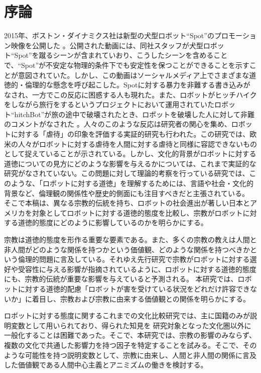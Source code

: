 \documentclass[a4j,12pt]{jreport}
\begin{document}
\chapter{序論}
2015年、ボストン・ダイナミクス社は新型の犬型ロボット``Spot''のプロモーション映像を公開した\cite{spot} 。公開された動画には、同社スタッフが犬型ロボット``Spot''を蹴るシーンが含まれていおり、こうしたシーンを含めることで、``Spot''が不安定な物理的条件下でも安定性を保つことができることを示すことが意図されていた。しかし、この動画はソーシャルメディア上でさまざまな道徳的・倫理的な懸念を呼び起こした。Spotに対する暴力を非難する書き込みがなされ、一方でこの反応に困惑する人も現れた。また、ロボットがヒッチハイクをしながら旅行をするというプロジェクトにおいて運用されていたロボット``hitchBot''が旅の途中で破壊されたとき、ロボットを破壊した人に対して非難のコメントがなされた\cite{hitch} 。人々のこのような反応は研究者の関心を集め、ロボットに対する「虐待」の印象を評価する実証的研究\cite{abuse}も行われた。この研究では、欧米の人々がロボットに対する虐待を人間に対する虐待と同様に容認できないものとして捉えていることが示されている。しかし、文化的背景がロボットに対する道徳についての見方にどのような影響を与えるかについては、これまで実証的な研究がなされていない。この問題に対して理論的考察を行っている研究\cite{coeck}では、このような、「ロボットに対する道徳」を理解するためには、言語や社会・文化的背景など、倫理観の関係性や歴史的側面にも注目すべきだと主張されている。
そこで本稿は、異なる宗教的伝統を持ち、ロボットの社会進出が著しい日本とアメリカを対象としてロボットに対する道徳的態度を比較し、宗教がロボットに対する道徳的態度にどのように影響しているのかを明らかにする。


宗教は道徳的態度を形作る重要な要素である。また、多くの宗教の教えは人間と非人間がどのような関係を持つかという価値観、どのような関係を持つべきかという倫理的問題に言及している。それゆえ先行研究\cite{phobia, mania, social}で宗教がロボットに対する選好や受容性に与える影響が指摘されているように、ロボットに対する道徳的態度にも、宗教的伝統が重要な影響を与えていると予測される。
本研究では、ロボットに対する道徳的配慮「ロボットが害を受けている状況をどれだけ許容できないか」に着目し、宗教および宗教に由来する価値観との関係を明らかにする。



ロボットに対する態度に関するこれまでの文化比較研究では、主に国籍のみが説明変数として用いられており\cite{review}、得られた知見を
研究対象となった文化圏以外に一般化することは困難であった。そこで、本研究では、宗教の影響のみならず、複数の文化で共通した影響力を持つ因子を特定することを試みる。そこで、そのような可能性を持つ説明変数として、宗教に由来し、人間と非人間の関係に言及した価値観である人間中心主義とアニミズムの働きを検討する。
\end{document}
